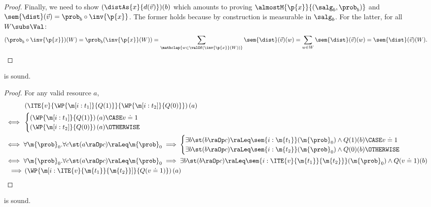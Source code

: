 \documentclass[acmsmall,nonacm,screen,appendix]{acmart}
\begin{document}
\begin{proof}
  Finally, we need to show $ (\distAs{x}{d(\vec{v})})(b) $
  which amounts to proving
  $\almostM{\p{x}}{(\salg_b,\prob_b)}$
  and
  $\sem{\dist}(\vec{v}) = \prob_b \circ \inv{\p{x}}$.
  The former holds because by construction  is measurable in $\salg_b$.
  For the latter, for all $W \subs \Val$:
  \[
    (\prob_b \circ \inv{\p{x}})(W)
    =
    \prob_b (\inv{\p{x}}(W))
    =
    \sum_{\mathclap{w \in \valOf(\inv{\p{x}}(W))}}
      \sem{\dist}(\vec{v})(w)
    =
    \sum_{w \in W}
      \sem{\dist}(\vec{v})(w)
    =
    \sem{\dist}(\vec{v})(W).
    \qedhere
  \]
\end{proof}
 \begin{lemma}
\label{proof:wp-if-prim}
   is sound.
\end{lemma}

\begin{proof}
  For any valid resource $a$,
  \begin{align*}
    & \left(\ITE{v}{\WP{\m[i: t_1]}{Q(1)}}{\WP{\m[i: t_2]}{Q(0)}}\right)(a)\\
    {}\iff {} &
    \begin{cases}
      \left(\WP{\m[i: t_1]}{Q(1)}\right)(a) \CASE v \doteq 1 \\
      \left(\WP{\m[i: t_2]}{Q(0)}\right)(a)\OTHERWISE \\
    \end{cases} \\
    {}\iff {}&
  \forall \m{\prob}_0.
    \forall c \st
    (a \raOp c) \raLeq \m{\prob}_0
    \implies
      \begin{cases}
          \exists b \st (b \raOp c) \raLeq \sem{i: \m{t_1}}(\m{\prob}_0)
      \land Q(1)(b)
      \CASE v \doteq 1 \\
          \exists b \st (b \raOp c) \raLeq \sem{i: \m{t_2}}(\m{\prob}_0)
      \land Q(0)(b)
      \OTHERWISE
      \end{cases} \\
    {}\iff {} &
    \forall \m{\prob}_0.
    \forall c \st
    (a \raOp c) \raLeq \m{\prob}_0
    {}\implies {}
    \exists b \st (b \raOp c) \raLeq \sem{i: \ITE{v}{\m{t_1}}{\m{t_2}}}(\m{\prob}_0)
      \land  Q(v \doteq 1)(b) \\
    \implies &  \left(\WP{\m[i: \ITE{v}{\m{t_1}}{\m{t_2}}]}{Q(v \doteq 1)}\right)(a)
  \end{align*}
\end{proof} \begin{lemma}
\label{proof:wp-bind}
   is sound.
\end{lemma}
\end{document}
